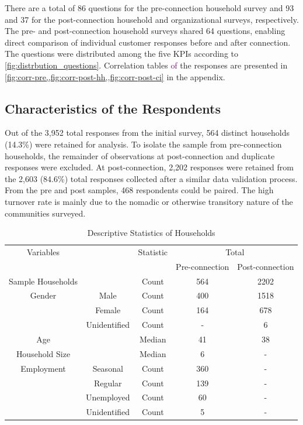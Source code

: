 There are a total of 86 questions for the pre-connection household survey and 93 and 37 for the post-connection household and organizational surveys, respectively. The pre- and post-connection household surveys shared 64 questions, enabling direct comparison of individual customer responses before and after connection. The questions were distributed among the five KPIs according to \cref{fig:distrbution_questions}. Correlation tables \textcolor{purple}{of} the responses are presented in \cref{fig:corr-pre,,fig:corr-post-hh,,fig:corr-post-ci} in the appendix.

\subsection{Characteristics of the Respondents}
Out of the 3,952 total responses from the initial survey, 564 distinct households (14.3\%) were retained for analysis. To isolate the sample from pre-connection households, the remainder of observations at post-connection and duplicate responses were excluded. At post-connection, 2,202 responses were retained from the 2,603 (84.6\%) total responses collected after a similar data validation process. From the pre and post samples, 468 respondents could be paired. The high turnover rate is mainly due to the nomadic or otherwise transitory nature of the communities surveyed.

\begin{table}[th]
\centering
	\begin{tabular}{*5c} 
		\toprule
		Variables &  & Statistic  &\multicolumn{2}{c}{Total}\\
		& &  & Pre-connection & Post-connection\\
		
		\midrule
		Sample Households  & & Count & 564 & 2202 \\
		Gender  & Male & Count & 400 & 1518\\
				& Female & Count & 164 & 678\\
				& Unidentified & Count & - & 6\\
		Age  &  & Median & 41 & 38\\
		Household Size  &  & Median & 6 & - \\
		Employment & Seasonal & Count & 360 & - \\
				   & Regular & Count & 139 & - \\
				   & Unemployed & Count & 60 & - \\
				   & Unidentified & Count & 5 & -\\
				   
		\bottomrule
	\end{tabular}
\caption{Descriptive Statistics of Households}
\label{tab:desc-stats-hh}
\end{table}

